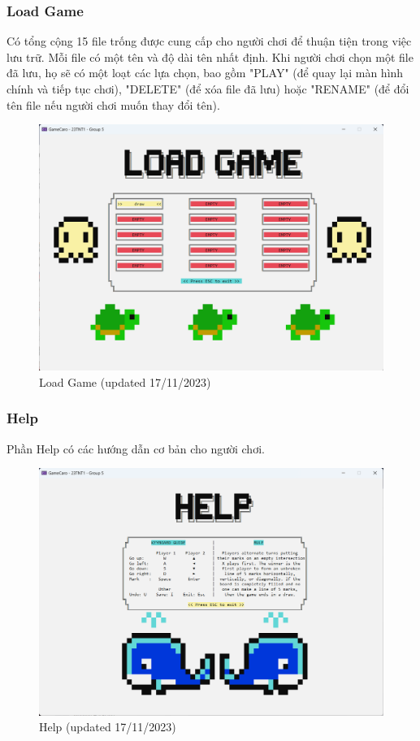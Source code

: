 \subsubsection{Load Game}
Có tổng cộng 15 file trống được cung cấp cho người chơi để thuận tiện trong việc lưu trữ. Mỗi file có một tên và độ dài tên nhất định. Khi người chơi chọn một file đã lưu, họ sẽ có một loạt các lựa chọn, bao gồm "PLAY" (để quay lại màn hình chính và tiếp tục chơi), "DELETE" (để xóa file đã lưu) hoặc "RENAME" (để đổi tên file nếu người chơi muốn thay đổi tên).
\begin{figure}[H]
    \centering
    \includegraphics[scale=.4]{img/loadgame.png}
    \caption{Load Game (updated 17/11/2023)}
\end{figure}
\clearpage
\subsubsection{Help}
Phần Help có các hướng dẫn cơ bản cho người chơi.
\begin{figure}[H]
    \centering
    \includegraphics[scale=.4]{img/help.png}
    \caption{Help (updated 17/11/2023)}
\end{figure}
\clearpage
